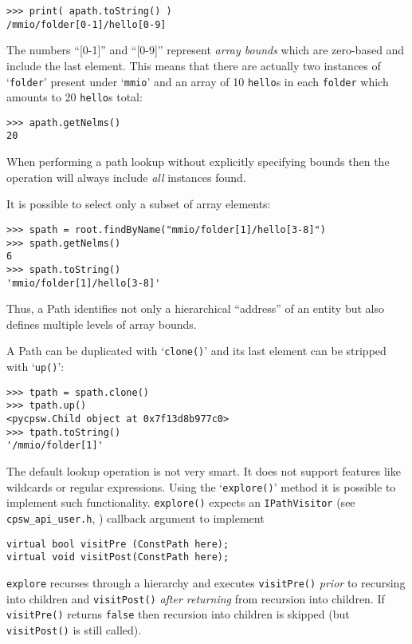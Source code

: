 \documentclass[10pt]{article}
\newcommand{\Path}      {{Path}}
\newcommand{\cod}[1] {{\tt#1}}
\begin{document}
\begin{verbatim}
>>> print( apath.toString() )
/mmio/folder[0-1]/hello[0-9]
\end{verbatim}

The numbers ``[0-1]'' and ``[0-9]'' represent {\em array bounds} which 
are zero-based and include the last element. This means that there are
actually two instances of `\cod{folder}' present under `\cod{mmio}' and
an array of 10 \cod{hello}s in each \cod{folder} which amounts to
20 \cod{hello}s total:

\begin{verbatim}
>>> apath.getNelms()
20
\end{verbatim}

When performing a path lookup without explicitly specifying bounds then
the operation will always include {\em all} instances found.

It is possible to select only a subset of array elements:

\begin{verbatim}
>>> spath = root.findByName("mmio/folder[1]/hello[3-8]")
>>> spath.getNelms()
6
>>> spath.toString()
'mmio/folder[1]/hello[3-8]'
\end{verbatim}

Thus, a \Path{} identifies not only a hierarchical ``address''
of an entity but also defines multiple levels of array bounds.

A \Path{} can be duplicated with `\cod{clone()}' and its last element
can be stripped with `\cod{up()}':

\begin{verbatim}
>>> tpath = spath.clone()
>>> tpath.up()
<pycpsw.Child object at 0x7f13d8b977c0>
>>> tpath.toString()
'/mmio/folder[1]'
\end{verbatim}

The default lookup operation is not very smart. It does not support features
like wildcards or regular expressions. Using the `\cod{explore()}' method it is
possible to implement such functionality. \cod{explore()} expects an \cod{IPathVisitor}
(see \cod{cpsw\_api\_user.h}, \cite{userapi}) callback argument to implement 
\begin{verbatim}
virtual bool visitPre (ConstPath here);
virtual void visitPost(ConstPath here);
\end{verbatim}

\cod{explore} recurses through a hierarchy and executes \cod{visitPre()} {\em prior}
to recursing into children and \cod{visitPost()} {\em after returning} from recursion
into children. If \cod{visitPre()} returns \cod{false} then recursion into children
is skipped (but \cod{visitPost()} is still called).
\end{document}
